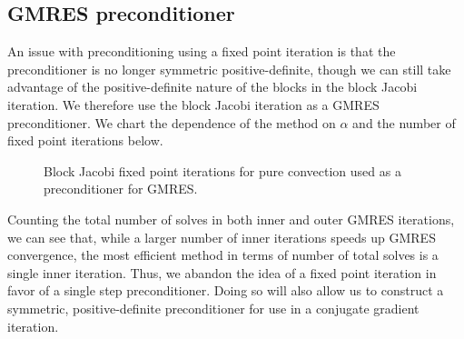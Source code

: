 \documentclass{article}
\begin{document}
\subsection{GMRES preconditioner}

An issue with preconditioning using a fixed point iteration is that the preconditioner is no longer symmetric positive-definite, though we can still take advantage of the positive-definite nature of the blocks in the block Jacobi iteration.  We therefore use the block Jacobi iteration as a GMRES preconditioner.  We chart the dependence of the method on $\alpha$ and the number of fixed point iterations below.  
\begin{figure}
\centering
{}
\caption{Block Jacobi fixed point iterations for pure convection used as a preconditioner for GMRES.}
\end{figure}
Counting the total number of solves in both inner and outer GMRES iterations, we can see that, while a larger number of inner iterations speeds up GMRES convergence, the most efficient method in terms of number of total solves is a single inner iteration.  Thus, we abandon the idea of a fixed point iteration in favor of a single step preconditioner.  Doing so will also allow us to construct a symmetric, positive-definite preconditioner for use in a conjugate gradient iteration.  
%
\end{document}
